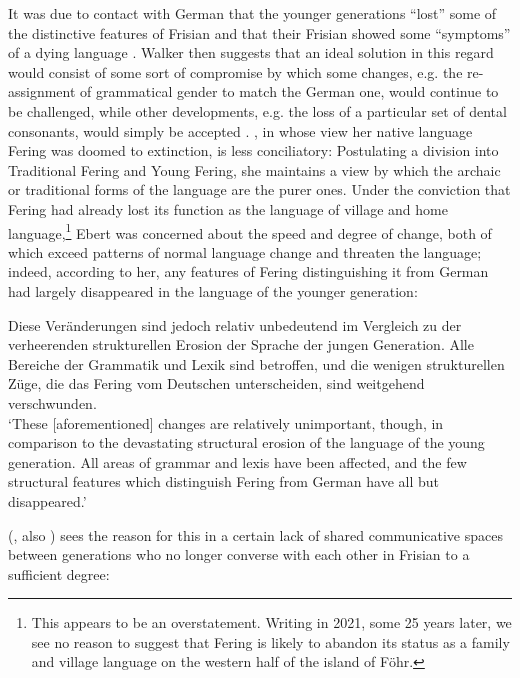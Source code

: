 \documentclass[output=paper]{langsci/langscibook}
\begin{document}
It was due to contact with German that the younger generations “lost” some of the distinctive features of Frisian and that their Frisian showed some “symptoms” of a dying language \citep[210]{Walker1986}. Walker then suggests that an ideal solution in this regard would consist of some sort of compromise by which some changes, e.g. the re-assignment of grammatical gender to match the German one, would continue to be challenged, while other developments, e.g. the loss of a particular set of dental consonants, would simply be accepted \citep[211]{Walker1986}. \citet{Ebert1994}, in whose view her native language Fering was doomed to extinction, is less conciliatory: Postulating a division into Traditional Fering and Young Fering, she maintains a view by which the archaic or traditional forms of the language are the purer ones. Under the conviction that Fering had already lost its function as the language of village and home language,\footnote{This appears to be an overstatement. Writing in 2021, some 25 years later, we see no reason to suggest that Fering is likely to abandon its status as a family and village language on the western half of the island of Föhr.} Ebert was concerned about the speed and degree of change, both of which exceed patterns of normal language change and threaten the language; indeed, according to her, any features of Fering distinguishing it from German had largely disappeared in the language of the younger generation:

\begin{modquote}
Diese Veränderungen sind jedoch relativ unbedeutend im Vergleich zu der verheerenden strukturellen Erosion der Sprache der jungen Generation. Alle Bereiche der Grammatik und Lexik sind betroffen, und die wenigen strukturellen Züge, die das Fering vom Deutschen unterscheiden, sind weitgehend verschwunden. \citep[11]{Ebert1994}\smallskip\\\relax
‘These [aforementioned] changes are relatively unimportant, though, in comparison to the devastating structural erosion of the language of the young generation. All areas of grammar and lexis have been affected, and the few structural features which distinguish Fering from German have all but disappeared.’
\end{modquote}

\citeauthor{Sjolin1997} (\citeyear{Sjolin1997}, also \citeyear{Sjolin1976}) sees the reason for this in a certain lack of shared communicative spaces between generations who no longer converse with each other in Frisian to a sufficient degree: 
\end{document}
